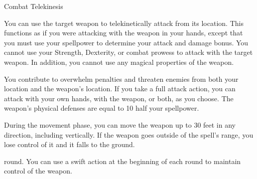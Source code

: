 \begin{spellsection}{Combat Telekinesis}
    \begin{spellheader}
    \end{spellheader}
    \begin{spellcontent}
        \begin{spelltargetinginfo}
            \spellrng{\rngclose}
        \end{spelltargetinginfo}
        \begin{spelleffects}
            \spelleffect You can use the target weapon to telekinetically attack from its location.
            This functions as if you were attacking with the weapon in your hands, except that you must use your spellpower to determine your attack and damage bonus.
            You cannot use your Strength, Dexterity, or combat prowess to attack with the target weapon.
            In addition, you cannot use any magical properties of the weapon.

            You contribute to overwhelm penalties and threaten enemies from both your location and the weapon's location.
            If you take a full attack action, you can attack with your own hands, with the weapon, or both, as you choose.
            The weapon's physical defenses are equal to 10 \add half your spellpower.

            During the movement phase, you can move the weapon up to 30 feet in any direction, including vertically.
            If the weapon goes outside of the spell's range, you lose control of it and it falls to the ground.

             round. You can use a swift action at the beginning of each round to maintain control of the weapon.
        \end{spelleffects}
    \end{spellcontent}
    \begin{spellfooter}
    \end{spellfooter}
\end{spellsection}

